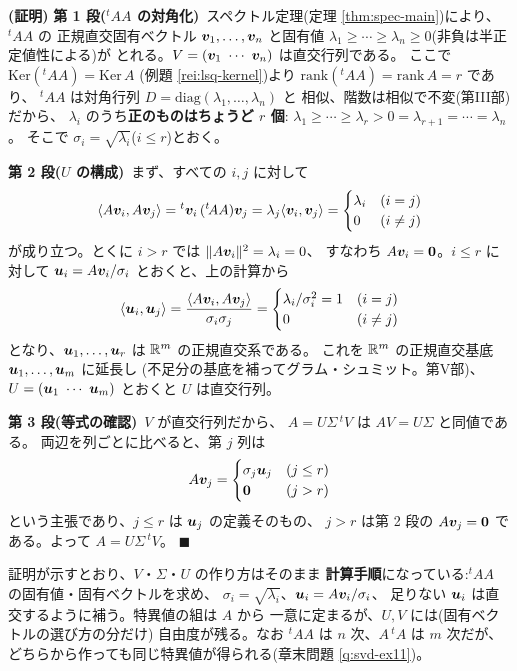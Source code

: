 \noindent\textbf{(証明)}\quad
\textbf{第 1 段(${}^t\!AA$ の対角化)}\
スペクトル定理(定理 \ref{thm:spec-main})により、${}^t\!AA$ の
正規直交固有ベクトル $\bm{v}_1, \dots, \bm{v}_n$ と固有値
$\lambda_1 \ge \cdots \ge \lambda_n \ge 0$(非負は半正定値性による)が
とれる。$V = (\vect{v}_1 \ \cdots \ \vect{v}_n)$ は直交行列である。
ここで $\mathrm{Ker}({}^t\!AA) = \mathrm{Ker}\,A$
(例題 \ref{rei:lsq-kernel})より
$\mathrm{rank}({}^t\!AA) = \mathrm{rank}\,A = r$ であり、
${}^t\!AA$ は対角行列 $D = \mathrm{diag}(\lambda_1, \dots, \lambda_n)$ と
相似、階数は相似で不変(第III部)だから、
$\lambda_i$ のうち\textbf{正のものはちょうど $r$ 個}:
$\lambda_1 \ge \cdots \ge \lambda_r > 0 = \lambda_{r+1} = \cdots = \lambda_n$。
そこで $\sigma_i = \sqrt{\lambda_i}$($i \le r$)とおく。

\textbf{第 2 段($U$ の構成)}\ まず、すべての $i, j$ に対して
\[
\langle A\bm{v}_i, A\bm{v}_j \rangle
= {}^t\bm{v}_i\,({}^t\!AA)\bm{v}_j
= \lambda_j \langle \bm{v}_i, \bm{v}_j \rangle
= \begin{cases} \lambda_i & (i = j) \\ 0 & (i \neq j) \end{cases}
\]
が成り立つ。とくに $i > r$ では $\|A\bm{v}_i\|^2 = \lambda_i = 0$、
すなわち $A\bm{v}_i = \bm{0}$。$i \le r$ に対して
$\bm{u}_i = A\bm{v}_i / \sigma_i$ とおくと、上の計算から
\[
\langle \bm{u}_i, \bm{u}_j \rangle
= \frac{\langle A\bm{v}_i, A\bm{v}_j \rangle}{\sigma_i \sigma_j}
= \begin{cases} \lambda_i / \sigma_i^2 = 1 & (i = j) \\ 0 & (i \neq j)
\end{cases}
\]
となり、$\bm{u}_1, \dots, \bm{u}_r$ は $\mathbb{R}^m$ の正規直交系である。
これを $\mathbb{R}^m$ の正規直交基底 $\bm{u}_1, \dots, \bm{u}_m$ に延長し
(不足分の基底を補ってグラム・シュミット。第V部)、
$U = (\bm{u}_1 \ \cdots \ \bm{u}_m)$ とおくと $U$ は直交行列。

\textbf{第 3 段(等式の確認)}\ $V$ が直交行列だから、
$A = U\Sigma\,{}^tV$ は $AV = U\Sigma$ と同値である。
両辺を列ごとに比べると、第 $j$ 列は
\[
A\bm{v}_j = \begin{cases} \sigma_j \bm{u}_j & (j \le r) \\
\bm{0} & (j > r) \end{cases}
\]
という主張であり、$j \le r$ は $\bm{u}_j$ の定義そのもの、
$j > r$ は第 2 段の $A\bm{v}_j = \bm{0}$ である。よって
$A = U\Sigma\,{}^tV$。 $\blacksquare$

\begin{chui}
証明が示すとおり、$V$・$\Sigma$・$U$ の作り方はそのまま
\textbf{計算手順}になっている:${}^t\!AA$ の固有値・固有ベクトルを求め、
$\sigma_i = \sqrt{\lambda_i}$、$\bm{u}_i = A\bm{v}_i/\sigma_i$、
足りない $\bm{u}_i$ は直交するように補う。特異値の組は $A$ から
一意に定まるが、$U, V$ には(固有ベクトルの選び方の分だけ)
自由度が残る。なお ${}^t\!AA$ は $n$ 次、$A\,{}^t\!A$ は $m$ 次だが、
どちらから作っても同じ特異値が得られる(章末問題 \ref{q:svd-ex11})。
\end{chui}

